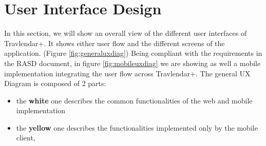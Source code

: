 \chapter{User Interface Design}
\label{cha:ui}
In this section, we will show an overall view of the different user interfaces of Travlendar+.
It shows either user flow and the different screens of the application. (Figure \ref{fig:generaluxdiag})
\newline
Being compliant with the requirements in the RASD document, in figure \ref{fig:mobileuxdiag} we are showing as well a mobile implementation integrating the user flow across Travlendar+.
\newline
The general UX Diagram is composed of 2 parts:
\begin{itemize}
	\item the \textbf{white} one describes the common functionalities of the web and mobile implementation
	\item the \textbf{yellow} one describes the functionalities implemented only by the mobile client,
\end{itemize}



